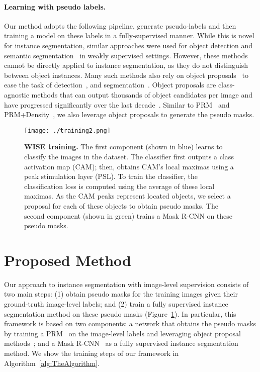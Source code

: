 \documentclass{bmvc2k}
\begin{document}
\paragraph{Learning with pseudo labels.}
Our method adopts the following pipeline, generate pseudo-labels and then training a model on these labels in a fully-supervised manner. While this is novel for instance segmentation, similar approaches were used for object detection \cite{tang2017multiple} and semantic segmentation~\cite{Dai2015boxsup, Qi2016imglev, khoreva2017simple} in weakly supervised settings. However, these methods cannot be directly applied to instance segmentation, as they do not distinguish between object instances. Many such methods also rely on object proposals~\cite{hosang2016makes} to ease the task of detection~\cite{Tang2018WSOD, Bilen2016CVPR}, and segmentation~\cite{pinheiro2015image, bearman2016s, Zhou2018PRM, kolesnikov2016seed}. Object proposals are class-agnostic methods that can output thousands of object candidates per image and have progressed significantly over the last decade~\cite{uijlings2013selective, zitnick2014edge, arbelaez2014mcg, maninis2016convolutional, pinheiro2015learning, pinheiro2016sharpmask}. Similar to PRM~\cite{Zhou2018PRM} and PRM+Density~\cite{cholakkal2019object}, we also leverage object proposals to generate the pseudo masks.



\begin{figure}[t]
    \centering
    \texttt{[image: ./training2.png]}
    \vspace{-9mm}
    \caption{{\bf WISE training.} The first component (shown in blue) learns to classify the images in the dataset. The classifier first outputs a class activation map (CAM); then, obtains CAM's local maximas using a peak stimulation layer (PSL). To train the classifier, the classification loss is computed using the average of these local maximas. As the CAM peaks represent located objects, we select a proposal for each of these objects to obtain pseudo masks. The second component (shown in green) trains a Mask R-CNN on these pseudo masks.}
    \label{fig:model}
\end{figure}

\section{Proposed Method}
\label{sec:proposed_method}
Our approach to instance segmentation with image-level supervision consists of two main steps: (1) obtain pseudo masks for the training images given their ground-truth image-level labels; and (2) train a fully supervised instance segmentation method on these pseudo masks (Figure~\ref{fig:model}). In particular, this framework is based on two components: a network that obtains the pseudo masks by training a PRM~\cite{Zhou2018PRM} on the image-level labels and leveraging object proposal methods~\cite{arbelaez2014mcg}; and a Mask R-CNN~\cite{he2017mask} as a fully supervised instance segmentation method. We show the training steps of our framework in Algorithm~\ref{alg:TheAlgorithm}.
\end{document}
